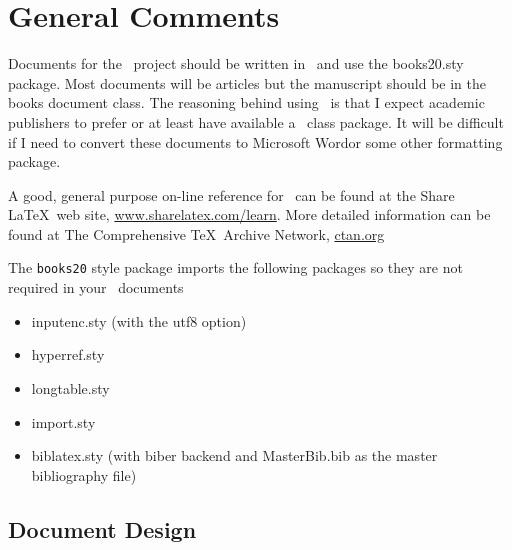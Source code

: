 \section{General Comments}

Documents for the \ProjectTitle\ project should be written in \LaTeXe\ and use
the books20.sty package. Most documents will be articles but the
manuscript should be in the books document class. The reasoning behind
using \LaTeXe\ is that I expect academic publishers to prefer or at
least have available a \LaTeXe\ class package.  It will be difficult if
I need to convert these documents to Microsoft Word\texttrademark or
some other formatting package.

A good, general purpose on-line reference for \LaTeXe\ can be found at
the Share \LaTeX\ web site,
\href{http://www.sharelatex.com/learn}{www.sharelatex.com/learn}.
More detailed information can be found at The Comprehensive
\TeX\ Archive Network, \href{ctan.org}{ctan.org}

The \texttt{books20} style package imports the following packages so they are
not required in your \LaTeXe\ documents

\begin{itemize}
\item inputenc.sty \cite{Jeffrey2018} (with the utf8 option)
\item hyperref.sty \cite{Rahtz2017}
\item longtable.sty \cite{Carlisle2014}
\item import.sty \cite{Arseneau2009}
\item biblatex.sty \cite{Lehman2018} (with biber backend and MasterBib.bib as the master
  bibliography file)
\end{itemize}


\subsection{Document Design}


